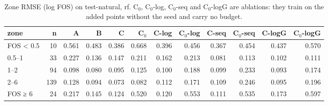 \begin{table}[htbp]
\centering
\small
\setlength{\tabcolsep}{4pt}
\caption{Zone RMSE (log FOS) on test-natural, rf. C$_0$, C$_0$-log, C$_0$-seq and C$_0$-logG are ablations: they train on the added points without the seed and carry no budget.}
\label{tab:test-natural__fos-rmse:zones_log:rf}
\begin{tabular}{lrrrrrrrrrrr}
\toprule
zone & n & A & B & C & C$_0$ & C-log & C$_0$-log & C-seq & C$_0$-seq & C-logG & C$_0$-logG \\
\midrule
FOS < 0.5 & 10 & 0.561 & 0.483 & 0.386 & 0.668 & 0.396 & 0.456 & 0.367 & 0.454 & 0.437 & 0.570 \\
0.5–1 & 33 & 0.227 & 0.136 & 0.147 & 0.211 & 0.162 & 0.213 & 0.081 & 0.113 & 0.102 & 0.111 \\
1–2 & 94 & 0.098 & 0.080 & 0.095 & 0.125 & 0.100 & 0.188 & 0.099 & 0.233 & 0.093 & 0.174 \\
2–6 & 139 & 0.128 & 0.094 & 0.073 & 0.082 & 0.112 & 0.171 & 0.109 & 0.246 & 0.095 & 0.196 \\
FOS ≥ 6 & 24 & 0.217 & 0.145 & 0.124 & 0.520 & 0.120 & 0.553 & 0.111 & 0.535 & 0.173 & 0.597 \\
\bottomrule
\end{tabular}
\end{table}
